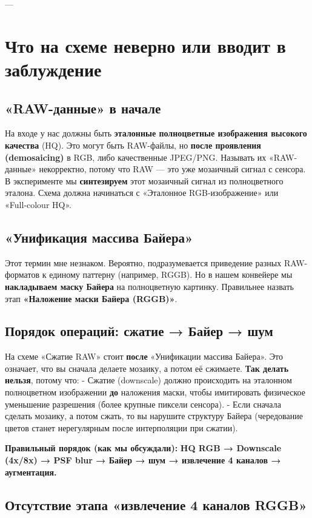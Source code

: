 \documentclass[12pt,a4paper]{article}
\begin{document}
---

\section{Что на схеме неверно или вводит в заблуждение}

\subsection{«RAW-данные» в начале}

На входе у нас должны быть \textbf{эталонные полноцветные изображения высокого качества} (HQ). Это могут быть RAW-файлы, но \textbf{после проявления (demosaicing)} в RGB, либо качественные JPEG/PNG. Называть их «RAW-данные» некорректно, потому что RAW — это уже мозаичный сигнал с сенсора. В эксперименте мы \textbf{синтезируем} этот мозаичный сигнал из полноцветного эталона. Схема должна начинаться с «Эталонное RGB-изображение» или «Full‑colour HQ».

\subsection{«Унификация массива Байера»}

Этот термин мне незнаком. Вероятно, подразумевается приведение разных RAW-форматов к единому паттерну (например, RGGB). Но в нашем конвейере мы \textbf{накладываем маску Байера} на полноцветную картинку. Правильнее назвать этап \textbf{«Наложение маски Байера (RGGB)»}.

\subsection{Порядок операций: сжатие → Байер → шум}

На схеме «Сжатие RAW» стоит \textbf{после} «Унификации массива Байера». Это означает, что вы сначала делаете мозаику, а потом её сжимаете. \textbf{Так делать нельзя}, потому что:
- Сжатие (downscale) должно происходить на эталонном полноцветном изображении \textbf{до} наложения маски, чтобы имитировать физическое уменьшение разрешения (более крупные пиксели сенсора).
- Если сначала сделать мозаику, а потом сжать, то вы нарушите структуру Байера (чередование цветов станет нерегулярным после интерполяции при сжатии).

\textbf{Правильный порядок (как мы обсуждали):}  
\textbf{HQ RGB → Downscale (4x/8x) → PSF blur → Байер → шум → извлечение 4 каналов → аугментация.}

\subsection{Отсутствие этапа «извлечение 4 каналов RGGB»}
\end{document}
